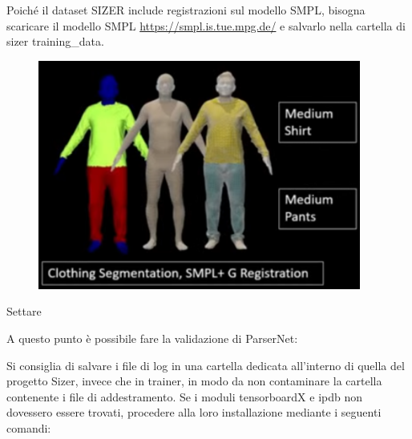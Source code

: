 \medskip\medskip\medskip







\medskip\medskip\medskip

Poiché il dataset SIZER include registrazioni sul modello SMPL, bisogna scaricare il modello SMPL \url{https://smpl.is.tue.mpg.de/} e salvarlo nella cartella di sizer training\_{}data.

\medskip\medskip\medskip

\begin{figure}[ht!]
  \centering
  \includegraphics[scale=1]{Images/SizerPic/Sizer2.png}
    \label{fig:Sizer2}
\end{figure}

\medskip\medskip\medskip

Settare

\medskip\medskip\medskip




\medskip

A questo punto è possibile fare la validazione di ParserNet:







\medskip

Si consiglia di salvare i file di log in una cartella dedicata all’interno di quella del progetto Sizer, invece che in trainer, in modo da non contaminare la cartella contenente i file di addestramento.
Se i moduli tensorboardX e ipdb non dovessero essere trovati, procedere alla loro installazione mediante i seguenti comandi:


